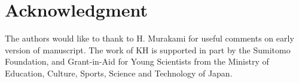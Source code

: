 \documentclass[12pt,reqno]{amsart}
\begin{document}
\section*{Acknowledgment}
The authors would like to thank
to H. Murakami for useful comments on early version of manuscript.
The work of KH is supported in part by the Sumitomo Foundation,
and
Grant-in-Aid for Young Scientists
from the Ministry of Education, Culture, Sports, Science and
Technology of Japan.
\end{document}
